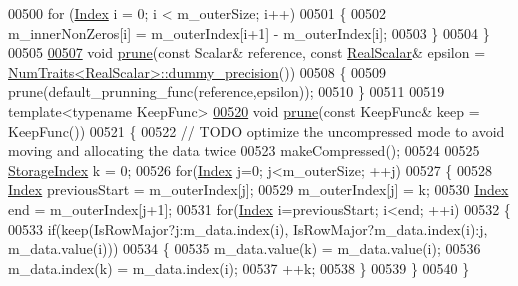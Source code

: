 \begin{DoxyCode}
00500       \textcolor{keywordflow}{for} (\hyperlink{group___core___module_a554f30542cc2316add4b1ea0a492ff02}{Index} i = 0; i < m\_outerSize; i++)
00501       \{
00502         m\_innerNonZeros[i] = m\_outerIndex[i+1] - m\_outerIndex[i]; 
00503       \}
00504     \}
00505     
\hyperlink{group___sparse_core___module_a08af03b2fc6c371c8be4fcd62509288c}{00507}     \textcolor{keywordtype}{void} \hyperlink{group___sparse_core___module_a08af03b2fc6c371c8be4fcd62509288c}{prune}(\textcolor{keyword}{const} Scalar& reference, \textcolor{keyword}{const} \hyperlink{group___sparse_core___module_aaec8ace6efb785c81d442931c3248d88}{RealScalar}& epsilon = 
      \hyperlink{group___core___module_struct_eigen_1_1_num_traits}{NumTraits<RealScalar>::dummy\_precision}())
00508     \{
00509       prune(default\_prunning\_func(reference,epsilon));
00510     \}
00511     
00519     \textcolor{keyword}{template}<\textcolor{keyword}{typename} KeepFunc>
\hyperlink{group___sparse_core___module_a0e5f8cc59ee57207f0cff6b142bcdd0d}{00520}     \textcolor{keywordtype}{void} \hyperlink{group___sparse_core___module_a0e5f8cc59ee57207f0cff6b142bcdd0d}{prune}(\textcolor{keyword}{const} KeepFunc& keep = KeepFunc())
00521     \{
00522       \textcolor{comment}{// TODO optimize the uncompressed mode to avoid moving and allocating the data twice}
00523       makeCompressed();
00524 
00525       \hyperlink{group___sparse_core___module_a0b540ba724726ebe953f8c0df06081ed}{StorageIndex} k = 0;
00526       \textcolor{keywordflow}{for}(\hyperlink{group___core___module_a554f30542cc2316add4b1ea0a492ff02}{Index} j=0; j<m\_outerSize; ++j)
00527       \{
00528         \hyperlink{group___core___module_a554f30542cc2316add4b1ea0a492ff02}{Index} previousStart = m\_outerIndex[j];
00529         m\_outerIndex[j] = k;
00530         \hyperlink{group___core___module_a554f30542cc2316add4b1ea0a492ff02}{Index} end = m\_outerIndex[j+1];
00531         \textcolor{keywordflow}{for}(\hyperlink{group___core___module_a554f30542cc2316add4b1ea0a492ff02}{Index} i=previousStart; i<end; ++i)
00532         \{
00533           \textcolor{keywordflow}{if}(keep(IsRowMajor?j:m\_data.index(i), IsRowMajor?m\_data.index(i):j, m\_data.value(i)))
00534           \{
00535             m\_data.value(k) = m\_data.value(i);
00536             m\_data.index(k) = m\_data.index(i);
00537             ++k;
00538           \}
00539         \}
00540       \}

\end{DoxyCode}
